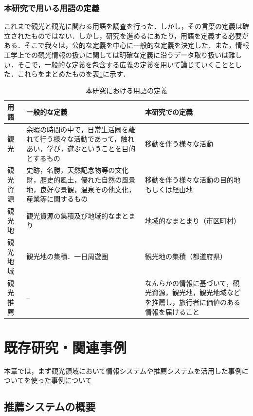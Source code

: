 \documentclass{jsarticle}
\begin{document}
\subsubsection{本研究で用いる用語の定義}

これまで観光と観光に関わる用語を調査を行った．しかし，その言葉の定義は確立されたものではない．しかし，研究を進めるにあたり，用語を定義する必要がある．そこで我々は，公的な定義を中心に一般的な定義を決定した．また，情報工学上での観光情報の扱いに関しては明確な定義に沿うデータ取り扱いは難しい．そこで，一般的な定義を包含する広義の定義を用いて論じていくこととした．これらをまとめたものを表\ref{define_of_tourism}に示す．

\begin{table}[!h]
\small
\caption{本研究における用語の定義}
\begin{center}
\begin{tabular}{lp{}p{}}
\label{define_of_tourism}
用語 & 一般的な定義 & 本研究での定義 \\ \hline
観光        & 余暇の時間の中で，日常生活圏を離れて行う様々な活動であって，触れあい，学び，遊ぶということを目的とするもの        & 移動を伴う様々な活動 \\
観光資源    & 史跡，名勝，天然記念物等の文化財，歴史的風土，優れた自然の風景地，良好な景観，温泉その他文化，産業等に関するもの  & 移動を伴う様々な活動の目的地もしくは経由地 \\
観光地      & 観光資源の集積及び地域的なまとまり    & 地域的なまとまり（市区町村） \\
観光地域    & 観光地の集積．一日周遊圏              & 観光地の集積（都道府県） \\
観光推薦    & --                                    & なんらかの情報に基づいて，観光資源，観光地，観光地域などを推薦し，旅行者に価値のある情報を届けること
\end{tabular}
\end{center}
\end{table}

\section{既存研究・関連事例}

本章では，まず観光領域において情報システムや推薦システムを活用した事例についてを使った事例について

\subsection{推薦システムの概要}
\end{document}
